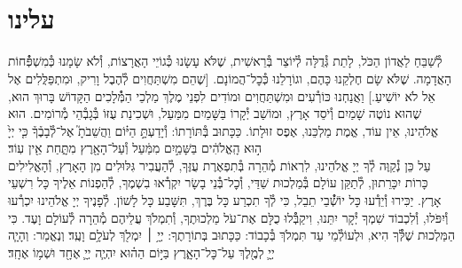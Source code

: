 \documentclass[twoside, openany, parskip=half, 11pt]{book}
\begin{document}
\uvaletzion

\\
\\


\label{end of shacharis}
\fullkaddish

\section*{ עלינו }

\newcommand{\aleinu}{
\firstword{עָלֵֽינוּ}
לְ֯שַׁבֵּחַ לַאֲדוֹן הַכֹּל, לָתֵת גְּ֯דֻלָּה לְ֯יוֹצֵר בְּ֯רֵאשִׁית, שֶׁלֹּא עָשָׂנוּ כְּ֯גוֹיֵי הָאֲרָצוֹת, וְ֯לֹא שָׂמָנוּ כְּ֯מִשְׁפְּ֯֯חוֹת הָאֲדָמָה. שֶׁלֹּא שָׂם חֶלְקֵנוּ כָּהֶם, וגוֹרָלֵנוּ כְּ֯כׇל־הֲמוֹנָם. [שֶׁהֵם מִשְׁתַּחֲוִים לְ֯הֶבֶל וָרִיק, וּמִתְפַּלֲּלִים אֶל אֵל לֹא יוֹשִׁיעַ.] וַאֲנַחְנוּ כּוֹרְ֯עִים וּמִשְׁתַּחֲוִים וּמוֹדִים לִפְנֵי מֶלֶךְ מַלְכֵי הַמְּ֯֯לָכִים הַקָּדוֹשׁ בָּרוּךְ הוּא, שֶׁהוּא נוֹטֶה שָׁמַיִם וְ֯יֹסֵד אָרֶץ, וּמוֹשַׁב יְ֯קָרוֹ בַּשָּׁמַיִם מִמַּעַל, וּשְׁכִינַת עֻזּוֹ בְּ֯גָבְ֯הֵי מְ֯רוֹמִים. הוּא אֱלֹהֵינוּ, אֵין עוֹד, אֱמֶת מַלְכֵּנוּ, אֶפֶס זוּלָתוֹ. כַּכָּתוּב בְּ֯תּוֹרָתוֹ: וְ֯יָדַעְתָּ֣
\source{דברים ד}
הַיּ֗וֹם וַהֲשֵׁבֹתָ֮ אֶל־לְ֯בָבֶ֒ךָ֒ כִּ֤י יְיָ֙ ה֣וּא הָֽאֱלֹהִ֔ים בַּשָּׁמַ֣יִם מִמַּ֔עַל וְ֯עַל־הָאָ֖רֶץ מִתָּ֑חַת אֵ֖ין עֽוֹד׃\\
עַל כֵּן נְ֯קַוֶּה לְ֯ךָ יְיָ אֱלֹהֵינוּ, לִרְאוֹת מְ֯הֵרָה בְּ֯תִפְאֶרֶת עֻזֶּךָ, לְ֯הַעֲבִיר גִּלּוּלִים מִן הָאָרֶץ, וְ֯הָאֱלִילִים כָּרוֹת יִכָּרֵתוּן, לְ֯תַקֵּן עוֹלָם בְּ֯מַלְכוּת שַׁדַּי, וְ֯כׇל־בְּ֯נֵי בָשָׂר יִקְרְ֯אוּ בִשְׁמֶךָ, לְ֯הַפְנוֹת אֵלֶיךָ כָּל רִשְׁעֵי אָרֶץ. יַכִּירוּ וְ֯יֵדְ֯עוּ כָּל יוֹשְׁ֯֯בֵי תֵבֵל, כִּי לְ֯ךָ תִכְרַע כָּל בֶּרֶךְ, תִּשָּׁבַע כָּל לָשׁוֹן. לְ֯פָנֶיךָ יְיָ אֱלֹהֵינוּ יִכְרְ֯עוּ וְ֯יִפֹּלוּ, וְ֯לִכְבוֹד שִׁמְךָ יְ֯קָר יִתֵּנוּ, \adforn{14} וִיקַבְּ֯֯לוּ כֻלָּם אֶת־עֹל מַלְכוּתֶךָ, וְ֯תִמְלֹךְ עֲלֵיהֶם מְ֯הֵרָה לְ֯עוֹלָם וָעֶד. כִּי הַמַּלְכוּת שֶׁלְּ֯֯ךָ הִיא, וּלְעוֹלְ֯מֵי עַד תִּמְלֹךְ בְּ֯כָבוֹד: כַּכָּתוּב בְּתוֹרָתֶךָ:\source{שמות טו} יְיָ֥ ׀ יִמְלֹ֖ךְ לְעֹלָ֥ם וָעֶֽד׃ וְנֶאֱמַר:\source{זכריה יד} וְהָיָ֧ה יְיָ֛ לְמֶ֖לֶךְ עַל־כׇּל־הָאָ֑רֶץ בַּיּ֣וֹם הַה֗וּא יִהְיֶ֧ה יְיָ֛ אֶחָ֖ד וּשְׁמ֥וֹ אֶחָֽד׃
}

\aleinu
\end{document}
